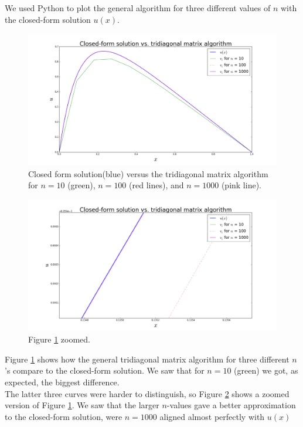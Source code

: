 \documentclass[12pt]{article}
\begin{document}
\noindent We used Python to plot the general algorithm for three different values of $n$ with the closed-form solution $u(x)$.

\begin{figure}[H]
    \centerline{\includegraphics[width=1.3\textwidth]{figure_1b.png}}
    \caption{Closed form solution(blue) versus the tridiagonal matrix algorithm for $n = 10$     (green), $n = 100$ (red lines), and $n = 1000$ (pink line). }
    \label{fig:1b}
\end{figure}

\begin{figure}[H]
    \centerline{\includegraphics[width=1.3\textwidth]{figure_1b_zoom.png}}
    \caption{Figure \ref{fig:1b} zoomed.}
    \label{fig:1bz}
\end{figure}

\noindent Figure \ref{fig:1b} shows how the general tridiagonal matrix algorithm for three different $n$'s compare to the closed-form solution. We saw that for $n = 10$ (green) we got, as expected, the biggest difference.\\

\noindent The latter three curves were harder to distinguish, so Figure \ref{fig:1bz} shows a zoomed version of Figure \ref{fig:1b}. We saw that the larger $n$-values gave a better approximation to the closed-form solution, were $n = 1000$ aligned almost perfectly with $u(x)$\\ 
\end{document}
